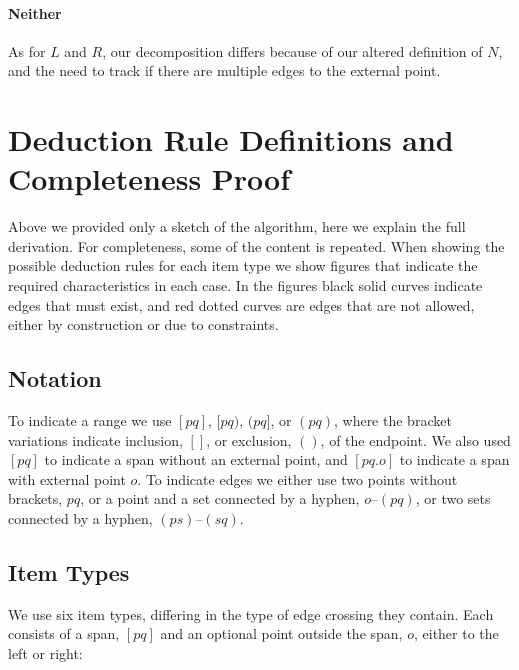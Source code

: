 \paragraph{Neither}
As for $L$ and $R$, our decomposition differs because of our altered definition of $N$, and the need to track if there are multiple edges to the external point.

\section{Deduction Rule Definitions and Completeness Proof} \label{sec:full-algorithm}

Above we provided only a sketch of the algorithm, here we explain the full derivation.
For completeness, some of the content is repeated.
When showing the possible deduction rules for each item type we show figures that indicate the required characteristics in each case.
In the figures black solid curves indicate edges that must exist, and red dotted curves are edges that are not allowed, either by construction or due to constraints.

\subsection{Notation}

To indicate a range we use $[pq]$, $[pq)$, $(pq]$, or $(pq)$, where the bracket variations indicate inclusion, $[]$, or exclusion, $()$, of the endpoint.
We also used $[pq]$ to indicate a span without an external point, and $[pq.o]$ to indicate a span with external point $o$.
To indicate edges we either use two points without brackets, \myeg $pq$, or a point and a set connected by a hyphen, \myeg $o$--$(pq)$, or two sets connected by a hyphen, \myeg $(ps)$--$(sq)$.

\subsection{Item Types}

We use six item types, differing in the type of edge crossing they contain.
Each consists of a span, $[pq]$ and an optional point outside the span, $o$, either to the left or right:

